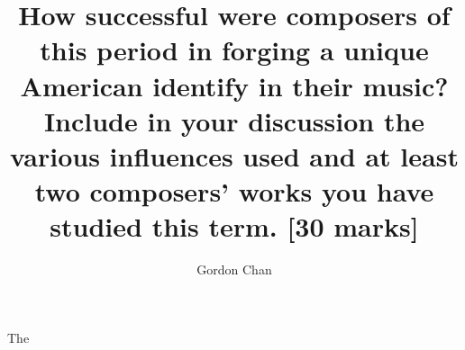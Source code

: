 \documentclass[a4paper]{article}
\title{How successful were composers of this period in forging a unique American identify in their music? Include in your discussion the various influences used and at least two composers' works you have studied this term. [30 marks]}
\author{Gordon Chan}
\begin{document}
\maketitle

The
\end{document}
